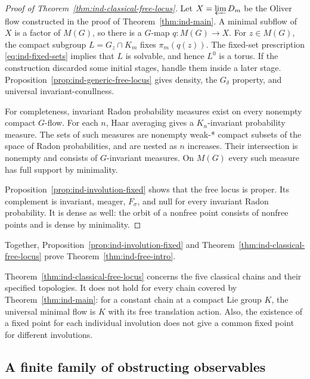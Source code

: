 \begin{proof}[Proof of Theorem~\ref{thm:ind-classical-free-locus}]
Let $X=\varprojlim D_m$ be the Oliver flow constructed in the proof
of Theorem~\ref{thm:ind-main}. A minimal subflow of $X$ is a factor of
$M(G)$, so there is a $G$-map $q:M(G)\to X$. For $z\in M(G)$,
the compact subgroup $L=G_z\cap K_m$ fixes $\pi_m(q(z))$.
The fixed-set prescription \eqref{eq:ind-fixed-sets} implies that
$L$ is solvable, and hence $L^0$ is a torus. If the construction
discarded some initial stages, handle them inside a later stage.
Proposition~\ref{prop:ind-generic-free-locus} gives density, the
$G_\delta$ property, and universal invariant-conullness.

For completeness, invariant Radon probability measures exist on
every nonempty compact $G$-flow. For each $n$, Haar averaging gives
a $K_n$-invariant probability measure. The sets of such measures
are nonempty weak-* compact subsets of the space of Radon
probabilities, and are nested as $n$ increases. Their intersection
is nonempty and consists of $G$-invariant measures. On $M(G)$ every
such measure has full support by minimality.

Proposition~\ref{prop:ind-involution-fixed} shows that the free locus
is proper. Its complement is invariant, meager, $F_\sigma$, and
null for every invariant Radon probability. It is dense as well:
the orbit of a nonfree point consists of nonfree points and is
dense by minimality.
\end{proof}

Together, Proposition~\ref{prop:ind-involution-fixed} and
Theorem~\ref{thm:ind-classical-free-locus} prove
Theorem~\ref{thm:ind-free-intro}.

\begin{remark}\label{rem:ind-remark-3}
Theorem~\ref{thm:ind-classical-free-locus} concerns the five classical
chains and their specified topologies. It does not hold for every
chain covered by Theorem~\ref{thm:ind-main}: for a constant chain at
a compact Lie group $K$, the universal minimal flow is $K$ with
its free translation action. Also, the existence of a fixed point
for each individual involution does not give a common fixed point
for different involutions.
\end{remark}


\subsection{A finite family of obstructing observables}\label{sec:ind-observables}

